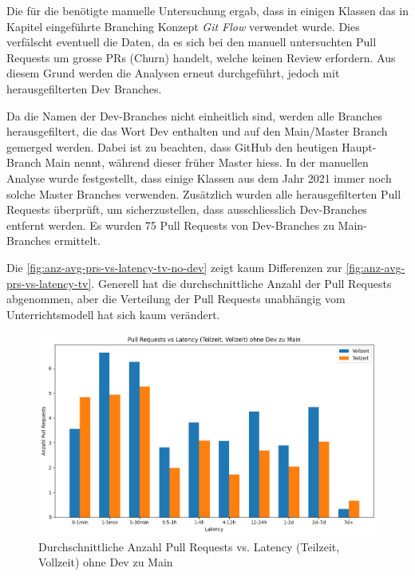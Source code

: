 Die für die  benötigte manuelle Untersuchung ergab, dass in einigen Klassen das in Kapitel  eingeführte Branching Konzept \textit{Git Flow} verwendet wurde. Dies verfälscht eventuell die Daten, da es sich bei den manuell untersuchten Pull Requests um grosse PRs (Churn) handelt, welche keinen Review erfordern. Aus diesem Grund werden die Analysen erneut durchgeführt, jedoch mit herausgefilterten Dev Branches.

Da die Namen der Dev-Branches nicht einheitlich sind, werden alle Branches herausgefiltert, die das Wort Dev enthalten und auf den Main/Master Branch gemerged werden. Dabei ist zu beachten, dass GitHub den heutigen Haupt-Branch Main nennt, während dieser früher Master hiess. In der manuellen Analyse wurde festgestellt, dass einige Klassen aus dem Jahr 2021 immer noch solche Master Branches verwenden. Zusätzlich wurden alle herausgefilterten Pull Requests überprüft, um sicherzustellen, dass ausschliesslich Dev-Branches entfernt werden. Es wurden 75 Pull Requests von Dev-Branches zu Main-Branches ermittelt.

Die \autoref{fig:anz-avg-prs-vs-latency-tv-no-dev} zeigt kaum Differenzen zur \autoref{fig:anz-avg-prs-vs-latency-tv}. Generell hat die durchschnittliche Anzahl der Pull Requests abgenommen, aber die Verteilung der Pull Requests unabhängig vom Unterrichtsmodell hat sich kaum verändert. 

\begin{figure}[htbp]
    \includegraphics[width=\textwidth]{Figures/anz-avg-prs-vs-latency-tv-no-dev.png}
    \caption{Durchschnittliche Anzahl Pull Requests vs. Latency (Teilzeit, Vollzeit) ohne Dev zu Main}
    \label{fig:anz-avg-prs-vs-latency-tv-no-dev}
\end{figure}
\newpage

